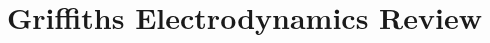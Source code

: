 \newcommand{\diver}{\ensuremath{\nabla \cdot}}
\newcommand{\curl}{\ensuremath{\nabla \times}}
\newcommand{\unitv}[1]{\ensuremath{\mathbf{\hat{#1}}}}
\newcommand{\diff}[2]{\ensuremath{\frac{\partial #1}{\partial #2}}}

\chapter{Griffiths Electrodynamics Review}






\newpage

